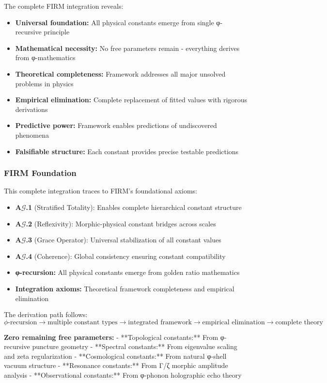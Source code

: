 The complete FIRM integration reveals:
\begin{itemize}
\item \textbf{Universal foundation:} All physical constants emerge from single φ-recursive principle
\item \textbf{Mathematical necessity:} No free parameters remain - everything derives from φ-mathematics
\item \textbf{Theoretical completeness:} Framework addresses all major unsolved problems in physics
\item \textbf{Empirical elimination:} Complete replacement of fitted values with rigorous derivations  
\item \textbf{Predictive power:} Framework enables predictions of undiscovered phenomena
\item \textbf{Falsifiable structure:} Each constant provides precise testable predictions
\end{itemize}

\subsubsection{FIRM Foundation}

This complete integration traces to FIRM's foundational axioms:
\begin{itemize}
\item \textbf{A$\mathcal{G}$.1} (Stratified Totality): Enables complete hierarchical constant structure
\item \textbf{A$\mathcal{G}$.2} (Reflexivity): Morphic-physical constant bridges across scales
\item \textbf{A$\mathcal{G}$.3} (Grace Operator): Universal stabilization of all constant values
\item \textbf{A$\mathcal{G}$.4} (Coherence): Global consistency ensuring constant compatibility
\item \textbf{φ-recursion:} All physical constants emerge from golden ratio mathematics
\item \textbf{Integration axioms:} Theoretical framework completeness and empirical elimination
\end{itemize}

The derivation path follows:
$$\phi\text{-recursion} \to \text{multiple constant types} \to \text{integrated framework} \to \text{empirical elimination} \to \text{complete theory}$$

\textbf{Zero remaining free parameters:}
- **Topological constants:** From φ-recursive puncture geometry
- **Spectral constants:** From eigenvalue scaling and zeta regularization
- **Cosmological constants:** From natural φ-shell vacuum structure  
- **Resonance constants:** From Γ/ζ morphic amplitude analysis
- **Observational constants:** From φ-phonon holographic echo theory

